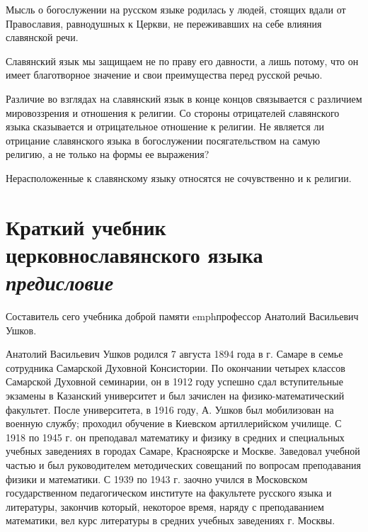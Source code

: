 \documentclass[11pt,a4paper,oneside]{memoir}
\begin{document}
    Мысль о богослужении на русском языке родилась у людей, стоящих вдали от Православия, равнодушных к Церкви, не переживавших на себе влияния славянской речи.
    
    Славянский язык мы защищаем не по праву его давности, а лишь потому, что он имеет благотворное значение и свои преимущества перед русской речью.
    
    Различие во взглядах на славянский язык в конце концов связывается с различием мировоззрения и отношения к религии. Со стороны отрицателей славянского языка сказывается и отрицательное отношение к религии. Не является ли отрицание славянского языка в богослужении посягательством на самую религию, а не только на формы ее выражения?
    
    Нерасположенные к славянскому языку относятся не сочувственно и к религии.
    
    \section*{Краткий учебник церковнославянского языка\\\emph{предисловие}}
    \label{sec:brief}
    
    Составитель сего учебника доброй памяти emph{профессор Анатолий Васильевич Ушков}.
    
    Анатолий Васильевич Ушков родился 7 августа 1894 года в г. Самаре в семье сотрудника Самарской Духовной Консистории. По окончании четырех классов Самарской Духовной семинарии, он в 1912 году успешно сдал вступительные экзамены в Казанский университет и был зачислен на физико-математический факультет. После университета, в 1916 году, А. Ушков был мобилизован на военную службу; проходил обучение в Киевском артиллерийском училище. С 1918 по 1945 г. он преподавал математику и физику в средних и специальных учебных заведениях в городах Самаре, Красноярске и Москве. Заведовал учебной частью и был руководителем методических совещаний по вопросам преподавания физики и математики. С 1939 по 1943 г. заочно учился в Московском государственном педагогическом институте на факультете русского языка и литературы, закончив который, некоторое время, наряду с преподаванием математики, вел курс литературы в средних учебных заведениях г. Москвы.
    
\end{document}
